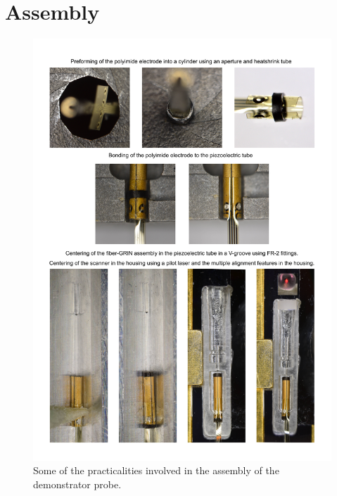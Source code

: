 \section{Assembly}
\begin{figure}[h!]\centering \includegraphics[width=12cm]{appendix/assyPhotos.pdf}
      \caption{Some of the practicalities involved in the assembly of the demonstrator probe.}
\end{figure}

\clearpage
